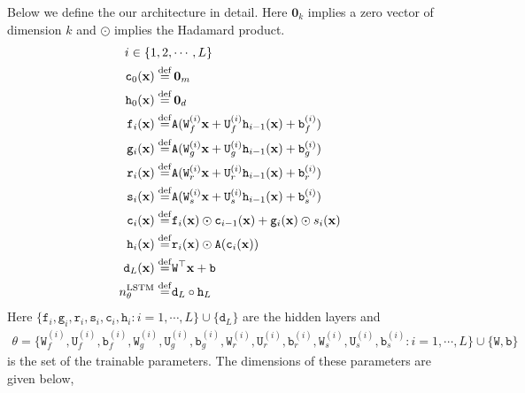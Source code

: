 Below we define the our architecture in detail. Here $\mathbf 0_k$ implies a zero vector of dimension $k$ and $\odot$ implies the Hadamard product.
\begin{align}
    i\in\{1,2,&\cdots, L\}\\
    \mathtt c_0(\mathbf x)\stackrel{\rm def}{=}&\,\mathbf 0_m\label{eq:layer-c0--steady-fp}\\
    \mathtt h_0(\mathbf x)\stackrel{\rm def}{=}&\,\mathbf 0_d\label{eq:layer-h0--steady-fp}\\
    \mathtt f_i(\mathbf x) \stackrel{\rm def}{=}& \mathtt A(\mathtt W_f^{(i)}\mathbf x + \mathtt U_f^{(i)}\mathtt h_{i-1}(\mathbf x) + \mathtt b_f^{(i)})\label{eq:layer-f--steady-fp}\\
    \mathtt g_i(\mathbf x) \stackrel{\rm def}{=}& \mathtt A(\mathtt W_g^{(i)}\mathbf x + \mathtt U_g^{(i)}\mathtt h_{i-1}(\mathbf x) + \mathtt b_g^{(i)})\label{eq:layer-g--steady-fp}\\
    \mathtt r_i(\mathbf x) \stackrel{\rm def}{=}& \mathtt A(\mathtt W_r^{(i)}\mathbf x + \mathtt U_r^{(i)}\mathtt h_{i-1}(\mathbf x) + \mathtt b_r^{(i)})\label{eq:layer-r--steady-fp}\\
    \mathtt s_i(\mathbf x) \stackrel{\rm def}{=}& \mathtt A(\mathtt W_s^{(i)}\mathbf x + \mathtt U_s^{(i)}\mathtt h_{i-1}(\mathbf x) + \mathtt b_s^{(i)})\label{eq:layer-s--steady-fp}\\
    \mathtt c_i(\mathbf x) \stackrel{\rm def}{=}&  \mathtt f_i(\mathbf x)\odot \mathtt c_{i-1}(\mathbf x) + \mathtt g_i(\mathbf x)\odot s_i(\mathbf x)\label{eq:layer-c--steady-fp}\\
    \mathtt h_i(\mathbf x) \stackrel{\rm def}{=}& \mathtt r_i(\mathbf x)\odot \mathtt A(\mathtt c_i(\mathbf x))\label{eq:layer-h--steady-fp}\\
    \mathtt d_L(\mathbf x)\stackrel{\rm def}{=}&\mathtt W^\top\mathbf x + \mathtt b\label{eq:layer-final--steady-fp}\\
    n^{{\rm LSTM}}_\theta \stackrel{\rm def}{=}& \mathtt d_L\circ \mathtt h_L\label{eq:def-LSTM--steady-fp} 
\end{align}
Here $\{\mathtt f_i, \mathtt g_i, \mathtt r_i, \mathtt s_i, \mathtt c_i, \mathtt h_i: i=1,\cdots,L\}\cup\{\mathtt d_L\}$ are the hidden layers and
\begin{align}
    \theta=\{\mathtt W_f^{(i)}, \mathtt U_f^{(i)}, \mathtt b_f^{(i)}, \mathtt W_g^{(i)}, \mathtt U_g^{(i)}, \mathtt b_g^{(i)}, \mathtt W_r^{(i)}, \mathtt U_r^{(i)}, \mathtt b_r^{(i)}, \mathtt W_s^{(i)}, \mathtt U_s^{(i)}, \mathtt b_s^{(i)}:
i=1,\cdots,L\}\cup\{\mathtt W, \mathtt b\}\label{eq:theta-composition--steady-fp}
\end{align}is the set of the trainable parameters. The dimensions of these parameters are given below,
